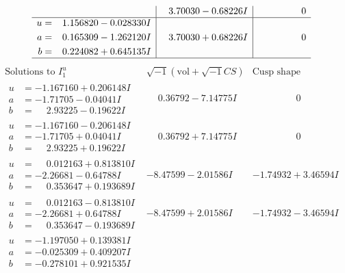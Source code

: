 \documentclass[1p]{elsarticle_modified}
\theoremstyle{definition}
\newcommand{\I}{\sqrt{-1}}
\begin{document}
$$\begin{array}{c|c|c}
 & \phantom{-}3.70030 - 0.68226 I & \phantom{-0.000000 } 0 \\ \hline\begin{aligned}
u &= \phantom{-}1.156820 - 0.028330 I \\
a &= \phantom{-}0.165309 - 1.262120 I \\
b &= \phantom{-}0.224082 + 0.645135 I\end{aligned}
 & \phantom{-}3.70030 + 0.68226 I & \phantom{-0.000000 } 0\\
 \hline 
 \end{array}$$\newpage$$\begin{array}{c|c|c}  
\text{Solutions to }I^u_{1}& \I (\text{vol} + \sqrt{-1}CS) & \text{Cusp shape}\\
 \hline 
\begin{aligned}
u &= -1.167160 + 0.206148 I \\
a &= -1.71705 - 0.04041 I \\
b &= \phantom{-}2.93225 - 0.19622 I\end{aligned}
 & \phantom{-}0.36792 - 7.14775 I & \phantom{-0.000000 } 0 \\ \hline\begin{aligned}
u &= -1.167160 - 0.206148 I \\
a &= -1.71705 + 0.04041 I \\
b &= \phantom{-}2.93225 + 0.19622 I\end{aligned}
 & \phantom{-}0.36792 + 7.14775 I & \phantom{-0.000000 } 0 \\ \hline\begin{aligned}
u &= \phantom{-}0.012163 + 0.813810 I \\
a &= -2.26681 - 0.64788 I \\
b &= \phantom{-}0.353647 + 0.193689 I\end{aligned}
 & -8.47599 - 2.01586 I & -1.74932 + 3.46594 I \\ \hline\begin{aligned}
u &= \phantom{-}0.012163 - 0.813810 I \\
a &= -2.26681 + 0.64788 I \\
b &= \phantom{-}0.353647 - 0.193689 I\end{aligned}
 & -8.47599 + 2.01586 I & -1.74932 - 3.46594 I \\ \hline\begin{aligned}
u &= -1.197050 + 0.139381 I \\
a &= -0.025309 + 0.409207 I \\
b &= -0.278101 + 0.921535 I\end{aligned}

\end{array}$$
\end{document}
